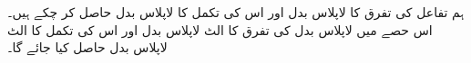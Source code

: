 ہم تفاعل  کی تفرق  کا لاپلاس بدل اور اس کی تکمل  کا لاپلاس بدل حاصل کر چکے ہیں۔اس حصے میں لاپلاس بدل  کی تفرق  کا الٹ لاپلاس بدل اور اس کی تکمل  کا الٹ لاپلاس بدل حاصل کیا جائے گا۔


